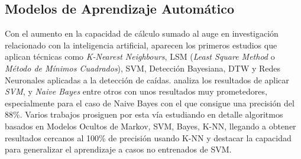 \begin{comment}

Sobre cálculos basados en cotas, tenemos \cite{fallindex00}, Kangas\cite{Kangas2008} lo compara con el uso ya sea de aceleración vertical o modulo de la aceleración y de nuevo obtiene resultados dispares según el tipo de caída simulada.

\todohide{
1- Monitorizado básico (usar módulo del vector aceleración y un threshold X )
2- Fall Index (Yoshida,  T.;  Mizuno,  F.;  Hayasaka,  T.;  Tsubota,  K.;  Wada,  S.;  Yamaguchi,  T.  A  Wearable  Computer System for a Detection and Prevention of Elderly Users from Falling. In Proceedings of  the  12th  International  Conference  on  Biomedical  and  Medical  Engineering  (ICBME),  Singapore, Singapore, 7–10 December 2005.  )
3- PerFallD (Dai, J.; Bai, X.; Yang, Z.; Shen, Z.; Xuan, D. PerFallD: A Pervasive Fall Detection System using Mobile   Phones.   In   Proceedings   of   the   8th   IEEE   International   Conference   on   Pervasive   Computing  and  Communications  Workshops  (PERCOM  Workshops),  Mannheim,  Germany,    29 March–2 April 2010; pp. 292–297) (usa también un giroscopio)
4- iFall (Sposaro,  F.;  Tyson,  G.  IFall:  An  Android  Application  for  Fall  Monitoring  and  Response.    In Proceedings of the Annual International Conference of the IEEE Engineering in Medicine and Biology Society (EMBC 2009), Minneapolis, MN, USA, 2–6 September 2009; pp. 6119–6122. )}

\end{comment}


\subsection{Modelos de Aprendizaje Automático}\label{sec:arte:modelos_ml}

Con el aumento en la capacidad de cálculo sumado al auge en investigación relacionado con la inteligencia artificial, aparecen los primeros estudios que aplican técnicas como \textit{K-Nearest Neighbours}, LSM (\textit{Least Square Method} o \textit{Método de Mínimos Cuadrados}), SVM, Detección Bayesiana, DTW y Redes Neuronales aplicadas a la detección de caídas.  analiza los resultados de aplicar \textit{SVM},  y \textit{Naive Bayes} entre otros con unos resultados muy prometedores, especialmente para el caso de Naive Bayes con el que consigue una precisión del 88\%. Varios trabajos \cite{Luque2014,ReyesOrtiz2014,tfall,Ozdemir2014} prosiguen por esta vía estudiando en detalle algoritmos basados en Modelos Ocultos de Markov, SVM, Bayes, K-NN, llegando a obtener resultados cercanos al 100\% de precisión usando K-NN \cite{Ozdemir2014} y destacar la capacidad para generalizar el aprendizaje a casos no entrenados de SVM\cite{tfall, Aziz2017b}.

